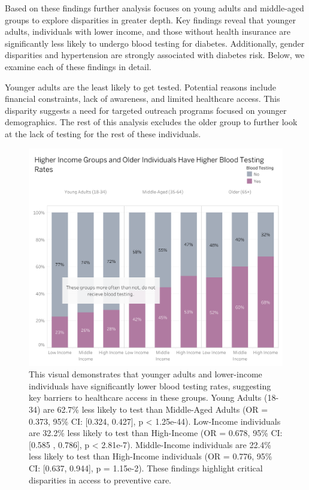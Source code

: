 \documentclass[
]{article}
\begin{document}
Based on these findings further analysis focuses on young adults and
middle-aged groups to explore disparities in greater depth. Key findings
reveal that younger adults, individuals with lower income, and those
without health insurance are significantly less likely to undergo blood
testing for diabetes. Additionally, gender disparities and hypertension
are strongly associated with diabetes risk. Below, we examine each of
these findings in detail.

Younger adults are the least likely to get tested. Potential reasons
include financial constraints, lack of awareness, and limited healthcare
access. This disparity suggests a need for targeted outreach programs
focused on younger demographics. The rest of this analysis excludes the
older group to further look at the lack of testing for the rest of these
individuals.

\begin{figure}[H]

{\centering \includegraphics[width=0.7\linewidth]{../figures/Blood Testing Disparities by Age and Income} 

}

\caption{This visual demonstrates that younger adults and lower-income individuals have significantly lower blood testing rates, suggesting key barriers to healthcare access in these groups. Young Adults (18-34) are 62.7\% less likely to test than Middle-Aged Adults (OR = 0.373, 95\% CI: [0.324, 0.427], p < 1.25e-44). Low-Income individuals are 32.2\% less likely to test than High-Income (OR = 0.678, 95\% CI: [0.585 , 0.786], p < 2.81e-7). Middle-Income individuals are 22.4\% less likely to test than High-Income individuals (OR = 0.776, 95\% CI: [0.637, 0.944], p = 1.15e-2). These findings highlight critical disparities in access to preventive care.}\label{fig:fig_testing_by_age_income}
\end{figure}
\end{document}
